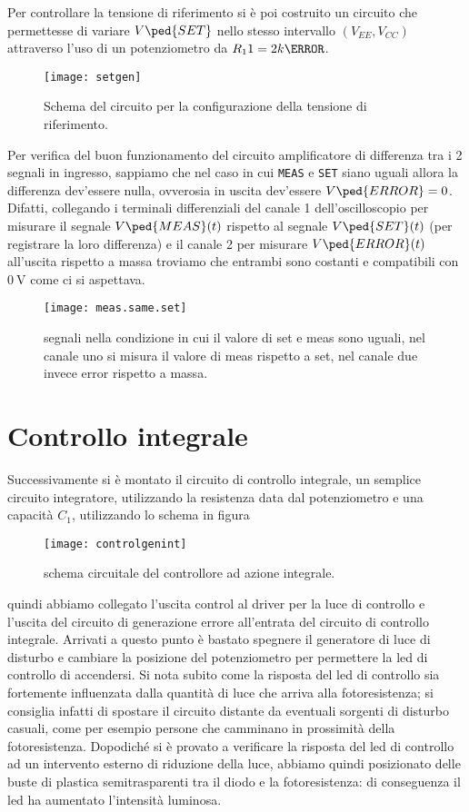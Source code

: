 \documentclass[10pt, a4paper, italian]{article}
\begin{document}
Per controllare la tensione di riferimento si è poi costruito un circuito che
permettesse di variare $V\ped{SET}$ nello stesso intervallo
$(V_{EE}, V_{CC})$ attraverso l'uso di un potenziometro da $R_11 = 2 k\ohm$.
\begin{figure}[htbp]
    \centering
	\texttt{[image: setgen]}
    \caption{Schema del circuito per la configurazione della tensione di
    riferimento.
    \label{schm: setgen}}
\end{figure}
Per verifica del buon funzionamento del circuito amplificatore di differenza
tra i 2 segnali in ingresso, sappiamo che nel caso in cui \verb+MEAS+ e
\verb+SET+ siano uguali allora la differenza dev'essere nulla, ovverosia
in uscita dev'essere $V\ped{ERROR} = 0$.
Difatti, collegando i terminali differenziali del canale 1 dell'oscilloscopio
per misurare il segnale $V\ped{MEAS} (t)$ rispetto al segnale $V\ped{SET} (t)$
(per registrare la loro differenza) e il canale 2 per misurare
$V\ped{ERROR} (t)$ all'uscita rispetto a massa troviamo che entrambi sono
costanti e compatibili con $\SI{0}{\V}$ come ci si aspettava.
\begin{figure}[H]
    \centering
	\texttt{[image: meas.same.set]}
    \caption{segnali nella condizione in cui il valore di set e meas sono uguali, nel canale uno si misura il valore di meas rispetto a set, nel canale due invece error rispetto a massa.
    \label{fig: Draft1}}
\end{figure}

\section{Controllo integrale}
Successivamente si è montato il circuito di controllo integrale, un semplice circuito integratore, utilizzando la resistenza data dal potenziometro e una capacità $C_1$, utilizzando lo schema in figura
\begin{figure}[H]
    \centering
	\texttt{[image: controlgenint]}
    \caption{schema circuitale del controllore ad azione integrale.
    \label{fig: Draft1}}
\end{figure}
quindi abbiamo collegato l'uscita control al driver per la luce di controllo e l'uscita del circuito di generazione errore all'entrata del circuito di controllo integrale.
Arrivati a questo punto è bastato spegnere il generatore di luce di disturbo e cambiare la posizione del potenziometro per permettere la led di controllo di accendersi.
Si nota subito come la risposta del led di controllo sia fortemente influenzata dalla quantità di luce che arriva alla fotoresistenza; si consiglia infatti di spostare il circuito distante da eventuali sorgenti di disturbo casuali, come per esempio persone che camminano in prossimità della fotoresistenza. 
Dopodiché si è provato a verificare la risposta del led di controllo ad un intervento esterno di riduzione della luce, abbiamo quindi posizionato delle buste di plastica semitrasparenti tra il diodo e la fotoresistenza: di conseguenza il led ha aumentato l'intensità luminosa.
\end{document}
